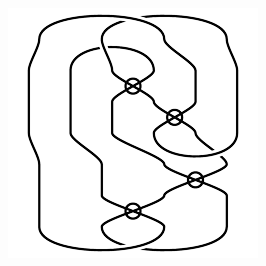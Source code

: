 \begin{figure}[H]
\begin{minipage}[b]{.18\linewidth}
\end{minipage}
\begin{minipage}[b]{.18\linewidth}
\centering
\includegraphics[width=\linewidth]{../data/virtual_4_16.png}
\end{minipage}
\end{figure}

